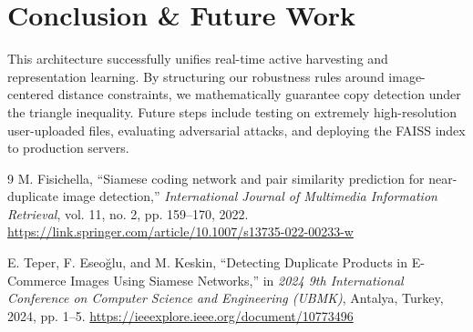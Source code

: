 \documentclass[11pt,a4paper]{article}
\begin{document}
\section{Conclusion \& Future Work}
This architecture successfully unifies real-time active harvesting and representation learning. By structuring our robustness rules around image-centered distance constraints, we mathematically guarantee copy detection under the triangle inequality. Future steps include testing on extremely high-resolution user-uploaded files, evaluating adversarial attacks, and deploying the FAISS index to production servers.

\begin{thebibliography}{9}
M. Fisichella, ``Siamese coding network and pair similarity prediction for near-duplicate image detection,'' \textit{International Journal of Multimedia Information Retrieval}, vol. 11, no. 2, pp. 159--170, 2022.
\url{https://link.springer.com/article/10.1007/s13735-022-00233-w}

E. Teper, F. Eseo\u{g}lu, and M. Keskin, ``Detecting Duplicate Products in E-Commerce Images Using Siamese Networks,'' in \textit{2024 9th International Conference on Computer Science and Engineering (UBMK)}, Antalya, Turkey, 2024, pp. 1--5.
\url{https://ieeexplore.ieee.org/document/10773496}
\end{thebibliography}
\end{document}

